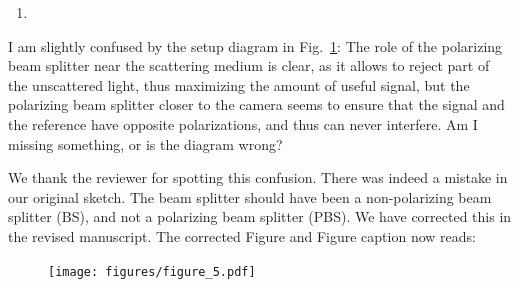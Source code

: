 \documentclass[12pt]{article}
\newenvironment{solved_reviewercomment}
    {\begin{tcolorbox}[width=\linewidth,colback=gray!5,colframe=solved_commentcolor!50,title=Reviewer Comment,left=5pt,right=5pt]}
    {\end{tcolorbox}}
\newenvironment{finished_ourresponse}
    {\begin{tcolorbox}[width=\linewidth,breakable,enhanced,colback=gray!5,colframe=finished_responsecolor!50,title=Response,left=5pt,right=5pt]}
    {\end{tcolorbox}}
\begin{document}
\begin{enumerate}[label=\arabic*., resume]
\item \leavevmode
\end{enumerate}
\vspace{-1em}
\begin{solved_reviewercomment}
    I am slightly confused by the setup diagram in Fig.~\ref{fig_5}: The role of the polarizing beam splitter near the scattering medium is clear, as it allows to reject part of the unscattered light, thus maximizing the amount of useful signal, but the polarizing beam splitter closer to the camera seems to ensure that the signal and the reference have opposite polarizations, and thus can never interfere. Am I missing something, or is the diagram wrong?
\end{solved_reviewercomment}

\begin{finished_ourresponse}
    We thank the reviewer for spotting this confusion. There was indeed a mistake in our original sketch. The beam splitter should have been a non-polarizing beam splitter (BS), and not a polarizing beam splitter (PBS). We have corrected this in the revised manuscript. The corrected Figure and Figure caption now reads:
            
    \vspace{1em}
    \begin{figure}[H]
        \centering
        \texttt{[image: figures/figure\_5.pdf]}
        \renewcommand{\thefigure}{5}
        \label{fig_5}
    \end{figure}
\end{finished_ourresponse}
        
\end{document}
